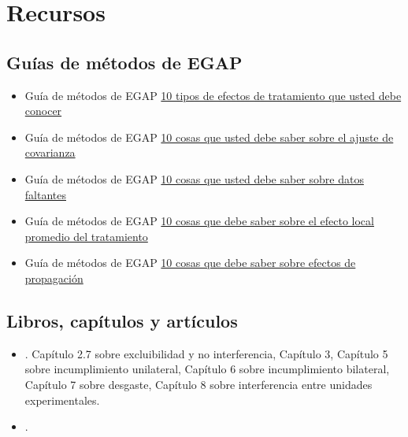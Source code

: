 \documentclass[12pt,spanish,]{book}
\begin{document}
\hypertarget{recursos-4}{%
\section{Recursos}\label{recursos-4}}

\hypertarget{guuxedas-de-muxe9todos-de-egap-3}{%
\subsection{Guías de métodos de EGAP}\label{guuxedas-de-muxe9todos-de-egap-3}}

\begin{itemize}
\item
  Guía de métodos de EGAP
  \href{https://egap.org/resource/10-types-of-treatment-effect-you-should-know-about/}{10 tipos de efectos de tratamiento que usted debe conocer}
\item
  Guía de métodos de EGAP \href{https://egap.org/resource/10-things-to-know-about-covariate-adjustment/}{10 cosas que usted debe saber sobre el ajuste de covarianza}
\item
  Guía de métodos de EGAP \href{https://egap.org/resource/10-things-to-know-about-missing-data/}{10 cosas que usted debe saber sobre datos faltantes}
\item
  Guía de métodos de EGAP \href{https://egap.org/resource/10-things-to-know-about-the-local-average-treatment-effect/}{10 cosas que debe saber sobre el efecto local promedio del tratamiento}
\item
  Guía de métodos de EGAP \href{https://egap.org/resource/10-things-to-know-about-spillovers/}{10 cosas que debe saber sobre efectos de propagación}
\end{itemize}

\hypertarget{libros-capuxedtulos-y-artuxedculos-3}{%
\subsection{Libros, capítulos y artículos}\label{libros-capuxedtulos-y-artuxedculos-3}}

\begin{itemize}
\item
  \autocite{gerber_field_2012}. Capítulo 2.7 sobre excluibilidad y no interferencia, Capítulo 3, Capítulo 5 sobre incumplimiento unilateral, Capítulo 6 sobre incumplimiento bilateral, Capítulo 7 sobre desgaste, Capítulo 8 sobre interferencia entre unidades experimentales.
\item
  \autocite{bowers2020causality}.
\end{itemize}
\end{document}
